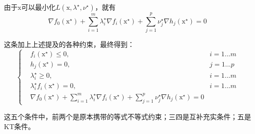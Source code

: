 \documentclass[a4paper]{D:/MyRepo/Script/latex/PaperReadingLog}
\begin{document}
由于$\mathrm{x}$可以最小化$L(\mathrm{x},\lambda^\star,\nu^\star)$，就有
$$
\nabla f_0(\mathrm{x}^\star)+\sum_{i=1}^m\lambda_i^\star\nabla f_i(\mathrm{x}^\star)+\sum_{j=1}^p\nu^\star_j\nabla h_j(\mathrm{x}^\star)=0
$$

这条加上上述提及的各种约束，最终得到：
\begin{equation}
    \label{equ9}
    \left\{
        \begin{aligned}
            &f_i(\mathrm{x}^\star)\le 0,&i=1...m\\
            &h_j(\mathrm{x}^\star)=0,&j=1...p\\
            &\lambda_i^\star\ge0,&i=1...m\\
            &\lambda_i^\star f_i(\mathrm{x}^\star)=0,&i=1...m\\
            &\nabla f_0(\mathrm{x}^\star)+\sum_{i=1}^m\lambda_i^\star\nabla f_i(\mathrm{x}^\star)+\sum_{j=1}^p\nu^\star_j\nabla h_j(\mathrm{x}^\star)=0
        \end{aligned}
        \right.
\end{equation}

这五个条件中，前两个是原本携带的等式不等式约束；三四是互补充实条件；五是KT条件。

\end{document}
